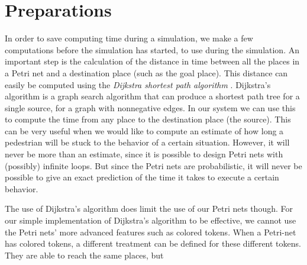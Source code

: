 \documentclass[11pt]{book}
\begin{document}
\section{Preparations}
In order to save computing time during a simulation, we make a few computations before the simulation has started, to use during the simulation. An important step is the calculation of the distance in time between all the places in a Petri net and a destination place (such as the goal place). This distance can easily be computed using the \emph{Dijkstra shortest path algorithm} \cite{dijkstra}. Dijkstra's algorithm is a graph search algorithm that can produce a shortest path tree for a single source, for a graph with nonnegative edges. In our system we can use this to compute the time from any place to the destination place (the source). This can be very useful when we would like to compute an estimate of how long a pedestrian will be stuck to the behavior of a certain situation. However, it will never be more than an estimate, since it is possible to design Petri nets with (possibly) infinite loops. But since the Petri nets are probabilistic, it will never be possible to give an exact prediction of the time it takes to execute a certain behavior.

The use of Dijkstra's algorithm does limit the use of our Petri nets though. For our simple implementation of Dijkstra's algorithm to be effective, we cannot use the Petri nets' more advanced features such as colored tokens. When a Petri-net has colored tokens, a different treatment can be defined for these different tokens. They are able to reach the same places, but 

\end{document}
